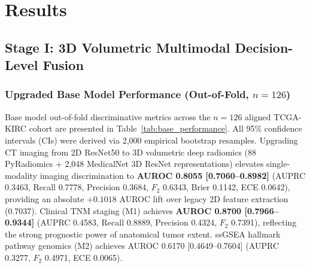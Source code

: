\section{Results}
\label{sec:results}

\subsection{Stage I: 3D Volumetric Multimodal Decision-Level Fusion}

\subsubsection{Upgraded Base Model Performance (Out-of-Fold, $n = 126$)}
Base model out-of-fold discriminative metrics across the $n=126$ aligned TCGA-KIRC cohort are presented in Table~\ref{tab:base_performance}. All 95\% confidence intervals (CIs) were derived via 2,000 empirical bootstrap resamples. Upgrading CT imaging from 2D ResNet50 to 3D volumetric deep radiomics (88 PyRadiomics + 2,048 MedicalNet 3D ResNet representations) elevates single-modality imaging discrimination to \textbf{AUROC 0.8055 [0.7060--0.8982]} (AUPRC 0.3463, Recall 0.7778, Precision 0.3684, $F_2$ 0.6343, Brier 0.1142, ECE 0.0642), providing an absolute $+0.1018$ AUROC lift over legacy 2D feature extraction (0.7037). Clinical TNM staging (M1) achieves \textbf{AUROC 0.8700 [0.7966--0.9344]} (AUPRC 0.4583, Recall 0.8889, Precision 0.4324, $F_2$ 0.7391), reflecting the strong prognostic power of anatomical tumor extent. ssGSEA hallmark pathway genomics (M2) achieves AUROC 0.6170 [0.4649--0.7604] (AUPRC 0.3277, $F_2$ 0.4971, ECE 0.0065).

